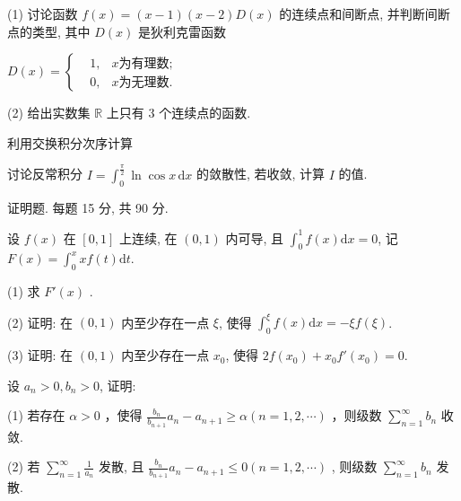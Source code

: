 (1) 讨论函数 $f(x) = (x - 1)(x - 2)D(x)$ 的连续点和间断点, 并判断间断点的类型, 其中 $D(x)$ 是狄利克雷函数\par
$D(x)=\left\{\begin{aligned}&1,&x \text{为有理数};\\ &0,&x \text{为无理数}.\end{aligned}\right.$\par
(2) 给出实数集 $\mathbb{R}$ 上只有 3 个连续点的函数.\par
利用交换积分次序计算 \par
讨论反常积分 $I = \int_{0}^{\frac{\pi}{2}} \ln \cos x \, \mathrm{d}x$ 的敛散性, 若收敛, 计算 $I$ 的值.\par
\par{}
证明题. 每题 15 分, 共 90 分.\par
设 $f(x)$ 在 $[0,1]$ 上连续, 在 $(0,1)$ 内可导, 且 $\int_0^1 f(x)\mathrm{d}x = 0$, 记 $F(x) = \int_0^x xf(t)\mathrm{d}t$.\par
(1) 求  $F'(x)$ .\par
(2) 证明: 在 $(0,1)$ 内至少存在一点 $\xi$, 使得 $\int_{0}^{\xi} f(x) \mathrm{d}x = -\xi f(\xi)$.\par
(3) 证明: 在 $(0,1)$ 内至少存在一点 $x_0$, 使得 $2f(x_0) + x_0 f'(x_0) = 0$.\par
设 $a_{n} > 0, b_{n} > 0$, 证明:\par
(1) 若存在  $\alpha > 0$ ，使得  $\frac{b_{n}}{b_{n+1}}a_{n} - a_{n+1} \geq \alpha (n = 1, 2, \cdots)$ ，则级数  $\sum_{n=1}^{\infty} b_{n}$  收敛.\par
(2) 若  $\sum_{n=1}^{\infty}\frac{1}{a_{n}}$  发散, 且  $\frac{b_{n}}{b_{n+1}}a_{n}-a_{n+1}\leq0(n=1,2,\cdots)$ , 则级数  $\sum_{n=1}^{\infty}b_{n}$  发散.\par
